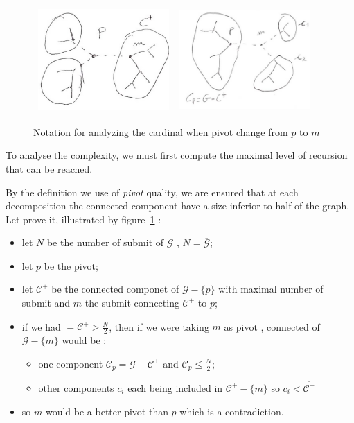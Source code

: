 \documentclass[a4paper]{article}
\begin{document}
\begin{figure}
\centering
\begin{tabular}{||c|c||}
 \hline \hline
\includegraphics[width=5cm]{FIGS/FTD-Pivp.jpg} &
\includegraphics[width=5cm]{FIGS/FTD-Pivm.jpg} 
 \\ \hline \hline
\end{tabular}
\caption{Notation for analyzing the cardinal when pivot change from $p$ to $m$}
\label{TreeComplexity}
\end{figure}


To analyse the complexity, we must first compute the maximal level of
recursion that can be reached.

By the definition we use of \emph{pivot} quality, we are ensured
that at each decomposition the connected component have a size inferior to
half of the graph. Let prove it, illustrated by figure~\ref{TreeComplexity} :

\begin{itemize}
     \item let $N$ be the number of submit of $\mathcal{G}$  , $N=\overline{\mathcal{G}}$;
     \item let $p$ be the pivot;
     \item let  $\mathcal{C}^+$ be the connected componet of $\mathcal{G}-\{p\}$ 
           with maximal number of submit and $m$ the submit connecting $\mathcal{C}^+$ to $p$;

     \item if we had   $=\overline{\mathcal{C}^+} > \frac{N}{2}$, then if we were taking $m$ as pivot ,
           connected of $\mathcal{G}-\{m\}$ would be :
          \begin{itemize}
               \item one component $\mathcal{C}_p=\mathcal{G} -\mathcal{C}^+$  and 
                     $\overline{\mathcal{C}_p} \leq \frac{N}{2}$;
               \item other components $c_i$ each being included in $\mathcal{C}^+-\{m\}$ so
                     $\overline{c_i} < \overline{\mathcal{C}^+}$
          \end{itemize}
      \item so $m$ would be a better pivot than $p$ which is a contradiction.
\end{itemize}
\end{document}
